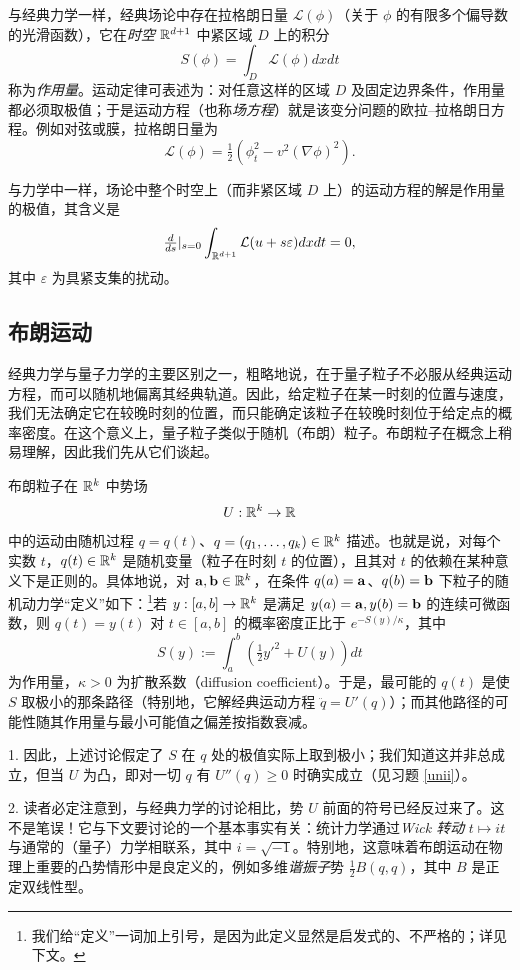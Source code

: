 与经典力学一样，经典场论中存在拉格朗日量 ${\mathcal L}(\phi)$（关于 $\phi$ 的有限多个偏导数的光滑函数），它在\emph{时空} $\Bbb R^{d+1}$ 中紧区域 $D$ 上的积分
$$
S(\phi)=\int_{D}{\mathcal L}(\phi)dxdt
$$
称为\emph{作用量}。运动定律可表述为：对任意这样的区域 $D$ 及固定边界条件，作用量都必须取极值；于是运动方程（也称\emph{场方程}）就是该变分问题的欧拉–拉格朗日方程。例如对弦或膜，拉格朗日量为
$$
{\mathcal L}(\phi)=\tfrac{1}{2}(\phi_t^2-v^{2}(\nabla \phi)^2). 
$$

\begin{remark} 与力学中一样，场论中整个时空上（而非紧区域 $D$ 上）的运动方程的解是作用量的极值，其含义是
$$
\tfrac{d}{ds}|_{s=0}\int_{\Bbb R^{d+1}}{\mathcal L}(u+s\varepsilon)dxdt=0,
$$
其中 $\varepsilon$ 为具紧支集的扰动。
\end{remark}

\subsection{布朗运动}

经典力学与量子力学的主要区别之一，粗略地说，在于量子粒子不必服从经典运动方程，而可以随机地偏离其经典轨道。因此，给定粒子在某一时刻的位置与速度，我们无法确定它在较晚时刻的位置，而只能确定该粒子在较晚时刻位于给定点的概率密度。在这个意义上，量子粒子类似于随机（布朗）粒子。布朗粒子在概念上稍易理解，因此我们先从它们谈起。

布朗粒子在 $\Bbb R^k$ 中势场
$$
U:\Bbb R^k\to \Bbb R
$$
中的运动由随机过程 $q=q(t)$、$q=(q_1, \ldots ,q_k)\in \Bbb R^k$ 描述。也就是说，对每个实数 $t$，$q(t)\in \Bbb R^k$ 是随机变量（粒子在时刻 $t$ 的位置），且其对 $t$ 的依赖在某种意义下是正则的。具体地说，对 $\bold a,\bold b\in \Bbb R^k$，在条件 $q(a)=\bold a$、$q(b)=\bold b$ 下粒子的随机动力学“定义”如下：\footnote{我们给“定义”一词加上引号，是因为此定义显然是启发式的、不严格的；详见下文。}若 $y:[a,b]\to \Bbb R^k$ 是满足 $y(a)=\bold a,y(b)=\bold b$ 的连续可微函数，则 $q(t)=y(t)$ 对 $t\in [a,b]$ 的概率密度正比于 $e^{-S(y)/\kappa}$，其中
$$
S(y):=\int_a^b
(\tfrac{1}{2}{y'}^2+U(y))dt
$$
为作用量，$\kappa>0$ 为扩散系数（diffusion coefficient）。于是，最可能的 $q(t)$ 是使 $S$ 取极小的那条路径（特别地，它解经典运动方程 $\ddot{q}=U'(q)$）；而其他路径的可能性随其作用量与最小可能值之偏差按指数衰减。

\begin{remark} 1. 因此，上述讨论假定了 $S$ 在 $q$ 处的极值实际上取到极小；我们知道这并非总成立，但当 $U$ 为凸，即对一切 $q$ 有 $U''(q)\ge 0$ 时确实成立（见习题 \ref{unii}）。

2. 读者必定注意到，与经典力学的讨论相比，势 $U$ 前面的符号已经反过来了。这不是笔误！它与下文要讨论的一个基本事实有关：统计力学通过\emph{Wick 转动} $t\mapsto it$ 与通常的（量子）力学相联系，其中 $i=\sqrt{-1}$。特别地，这意味着布朗运动在物理上重要的凸势情形中是良定义的，例如多维\emph{谐振子}势 $\frac{1}{2}B(q,q)$，其中 $B$ 是正定双线性型。
\end{remark}

